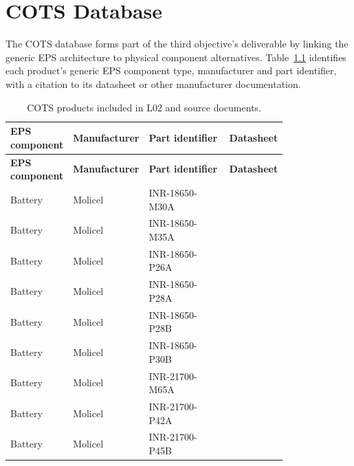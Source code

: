 \chapter{COTS Database}
\label{appendix:cots-database}

The COTS database forms part of the third objective's deliverable by linking the generic EPS architecture to physical component alternatives.
Table~\ref{tab:cots-database} identifies each product's generic EPS component type, manufacturer and part identifier, with a citation to its datasheet or other manufacturer documentation.
{\small
\setlength{\tabcolsep}{4pt}
\setlength{\parskip}{0pt}
\renewcommand{\arraystretch}{1.06}
\begin{longtable}{@{}>{\raggedright\arraybackslash}p{0.22\linewidth}>{\raggedright\arraybackslash}p{0.24\linewidth}>{\raggedright\arraybackslash}p{0.34\linewidth}>{\raggedright\arraybackslash}p{}@{}}
\caption{COTS products included in L02 and source documents.}\label{tab:cots-database}\\
\toprule
\textbf{EPS component} & \textbf{Manufacturer} & \textbf{Part identifier} & \textbf{Datasheet} \\
\midrule
\endfirsthead
\toprule
\textbf{EPS component} & \textbf{Manufacturer} & \textbf{Part identifier} & \textbf{Datasheet} \\
\midrule
\endhead
\bottomrule
\endfoot
Battery & Molicel & INR-18650-M30A & \citep[p.~1]{molicelm30adatasheet} \\
Battery & Molicel & INR-18650-M35A & \citep[p.~1]{cots-battery_molicel_m35a_datasheet} \\
Battery & Molicel & INR-18650-P26A & \citep[p.~1]{cots-battery_molicel_p26a_datasheet} \\
Battery & Molicel & INR-18650-P28A & \citep[p.~1]{cots-battery_molicel_p28a_datasheet} \\
Battery & Molicel & INR-18650-P28B & \citep[p.~1]{cots-battery_molicel_p28b_datasheet} \\
Battery & Molicel & INR-18650-P30B & \citep[p.~1]{cots-battery_molicel_p30b_datasheet} \\
Battery & Molicel & INR-21700-M65A & \citep[p.~1]{cots-battery_molicel_m65a_datasheet} \\
Battery & Molicel & INR-21700-P42A & \citep[p.~1]{cots-battery_molicel_p42a_datasheet} \\
Battery & Molicel & INR-21700-P45B & \citep[p.~1]{cots-battery_molicel_p45b_datasheet} \\

\end{longtable}}
